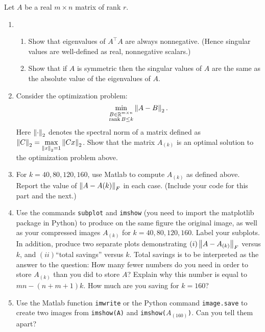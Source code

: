 \pb
Let $A$ be a real $m \times n$ matrix of rank $r$.
\begin{enumerate}[leftmargin=*]
\item 
\begin{enumerate}
\item Show that eigenvalues of $A^\top A$ are always nonnegative. (Hence singular values are well-defined as real, nonnegative scalars.)
\item Show that if $A$ is symmetric then the singular values of $A$ are the same as the absolute value of the eigenvalues of $A$.
\end{enumerate}
\item Consider the optimization problem: $$\min_{\substack{B\in\mathbb{R}^{m\times n}\\ \operatorname{rank} B\leq k} } \left\lVert A-B \right\rVert_{2}.$$
Here $\left\lVert \cdot \right\rVert_{2}$ denotes the spectral norm of a matrix defined as $\displaystyle\left\lVert C \right\rVert_{2} = \max_{\left\lVert x \right\rVert_{2} = 1} \left\lVert Cx \right\rVert_{2}$. Show that the matrix $A_{(k)}$ is an optimal solution to the optimization problem above.
\item For $k = 40, 80, 120, 160$, use Matlab to compute $A_{(k)}$ as defined above. Report the value of $\left\lVert A - A(k) \right\rVert_{F}$ in each case. (Include your code for this part and the next.)
\item Use the commands {\texttt{subplot}} and \texttt{imshow} (you need to import the matplotlib package in Python) to produce on the same figure the original image, as well as your compressed images $A_{(k)}$ for $k = 40,80,120,160$. Label your subplots. In addition, produce two separate plots demonstrating $(i)\left\lVert A-A_{(k)} \right\rVert_{F}$ versus $k$, and $(ii)$``total savings'' versus $k$. Total savings is to be interpreted as the answer to the question: How many fewer numbers do you need in order to store $A_{(k)}$ than you did to store $A$? Explain why this number is equal to $mn-(n+m+1)k$. How much are you saving for $k=160$? 
\item Use the Matlab function \texttt{imwrite} or the Python command \texttt{image.save} to create two images from \texttt{imshow(A)} and \texttt{imshow(}$A_{(160)}$\texttt{)}. Can you tell them apart?
\end{enumerate}

\soln

